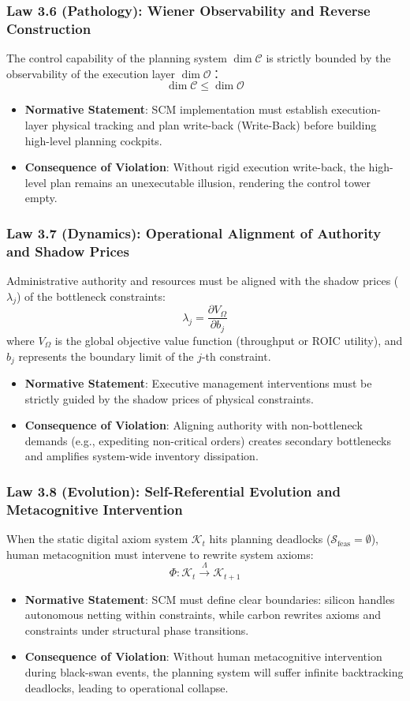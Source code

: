 \documentclass[11pt,a4paper]{article}
\begin{document}
\subsubsection{Law 3.6 (Pathology): Wiener Observability and Reverse Construction}
The control capability of the planning system $\dim \mathcal{C}$ is strictly bounded by the observability of the execution layer $\dim \mathcal{O}$：
$$\dim \mathcal{C} \le \dim \mathcal{O}$$
\begin{itemize}
    \item \textbf{Normative Statement}: SCM implementation must establish execution-layer physical tracking and plan write-back (Write-Back) before building high-level planning cockpits.
    \item \textbf{Consequence of Violation}: Without rigid execution write-back, the high-level plan remains an unexecutable illusion, rendering the control tower empty.
\end{itemize}

\subsubsection{Law 3.7 (Dynamics): Operational Alignment of Authority and Shadow Prices}
Administrative authority and resources must be aligned with the shadow prices ($\lambda_j$) of the bottleneck constraints:
$$\lambda_j = \frac{\partial V_{\Omega}}{\partial b_j}$$
where $V_{\Omega}$ is the global objective value function (throughput or ROIC utility), and $b_j$ represents the boundary limit of the $j$-th constraint.
\begin{itemize}
    \item \textbf{Normative Statement}: Executive management interventions must be strictly guided by the shadow prices of physical constraints.
    \item \textbf{Consequence of Violation}: Aligning authority with non-bottleneck demands (e.g., expediting non-critical orders) creates secondary bottlenecks and amplifies system-wide inventory dissipation.
\end{itemize}

\subsubsection{Law 3.8 (Evolution): Self-Referential Evolution and Metacognitive Intervention}
When the static digital axiom system $\mathcal{K}_t$ hits planning deadlocks ($\mathcal{S}_{\text{feas}} = \emptyset$), human metacognition must intervene to rewrite system axioms:
$$\Phi: \mathcal{K}_t \xrightarrow{\Lambda} \mathcal{K}_{t+1}$$
\begin{itemize}
    \item \textbf{Normative Statement}: SCM must define clear boundaries: silicon handles autonomous netting within constraints, while carbon rewrites axioms and constraints under structural phase transitions.
    \item \textbf{Consequence of Violation}: Without human metacognitive intervention during black-swan events, the planning system will suffer infinite backtracking deadlocks, leading to operational collapse.
\end{itemize}
\end{document}
